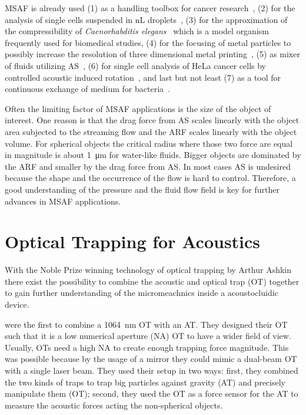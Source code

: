 MSAF is already used (1) as a handling toolbox for cancer 
research~\cite{Antfolk2015,Wu2021,Wang2020,Nguyen2021}, (2) for the analysis of 
single cells suspended in \si{\nano\liter} droplets~\cite{Gerlt2020a}, (3) for 
the approximation of the compressibility of \emph{Caenorhabditis 
elegans}~\cite{Baasch2018} which is a model organism frequently used for 
biomedical studies, (4) for the focusing of metal particles to possibly 
increase the resolution of three dimensional metal printing~\cite{Gerlt2022}, 
(5) as mixer of fluids utilizing 
AS~\cite{Patel2014,Ozcelik2014,Bachman2020,Zhang2021}, (6) for single cell 
analysis of HeLa cancer cells by controlled acoustic induced 
rotation~\cite{Laeubli2021}, and last but not least (7) as a tool for 
continuous exchange of medium for bacteria~\cite{Gerlt2021}.

Often the limiting factor of MSAF applications is the size of the object of 
interest. One reason is that the drag force from AS scales linearly with the 
object area subjected to the streaming flow and the ARF scales linearly with 
the object volume. For spherical objects the critical radius where those two 
force are equal in magnitude is about \SI{1}{\um} for water-like fluids. Bigger 
objects are dominated by the ARF and smaller by the drag force from AS. In most 
cases AS is undesired because the shape and the occurrence of the flow is hard 
to control. Therefore, a good understanding of the pressure and the fluid flow 
field is key for further advances in MSAF applications.

\section{Optical Trapping for Acoustics}

With the Noble Prize winning technology of optical trapping by Arthur 
Ashkin~\cite{Ashkin1978,Ashkin1987,Ashkin2002,Ashkin1986,Ashkin1992,Ashkin1997} 
there exist the possibility to combine the acoustic and optical trap (OT) 
together to gain further understanding of the micromeachnics inside a 
acoustocluidic device.

 were the first to combine a \SI{1064}{\nm} OT with an 
AT.  They designed their OT such that it is a low numerical aperture (NA) OT to 
have a wider field of view. Usually, OTs need a high NA to create enough 
trapping force magnitude. This was possible because by the usage of a mirror 
they could mimic a dual-beam OT with a single laser beam. They used their setup 
in two ways: first, they combined the two kinds of traps to trap big particles 
against gravity (AT) and precisely manipulate them (OT); second, they used the 
OT as a force sensor for the AT to measure the acoustic forces acting the 
non-spherical objects.

